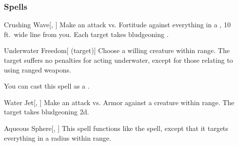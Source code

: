 \subsubsection{Spells}


\lowercase{\hypertarget{spell:Crushing Wave}{}}\label{spell:Crushing Wave}
\begin{apability}[\nth{1}]{\hypertarget{spell:Crushing Wave}{Crushing Wave}}[, ]
Make an attack vs. Fortitude against everything in a \arealarge, 10 ft.\ wide line from you.
\hit Each target takes bludgeoning .
\end{apability}
\vspace{0.25em}



\lowercase{\hypertarget{spell:Underwater Freedom}{}}\label{spell:Underwater Freedom}
\begin{attuneability}[\nth{1}]{\hypertarget{spell:Underwater Freedom}{Underwater Freedom}}[ (target)]
Choose a willing creature within \rngclose range.
The target suffers no penalties for acting underwater, except for those relating to using ranged weapons.

You can cast this spell as a .
\end{attuneability}
\vspace{0.25em}



\lowercase{\hypertarget{spell:Water Jet}{}}\label{spell:Water Jet}
\begin{apability}[\nth{1}]{\hypertarget{spell:Water Jet}{Water Jet}}[, ]
Make an attack vs. Armor against a creature within \rngclose range.
\hit The target takes bludgeoning  \plus2d.
\end{apability}
\vspace{0.25em}



\lowercase{\hypertarget{spell:Aqueous Sphere}{}}\label{spell:Aqueous Sphere}
\begin{apability}[\nth{2}]{\hypertarget{spell:Aqueous Sphere}{Aqueous Sphere}}[, ]
This spell functions like the  spell, except that it targets everything in a \areasmall radius within \rngmed range.
\end{apability}
\vspace{0.25em}



